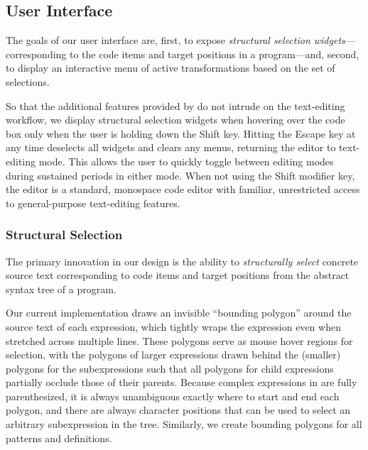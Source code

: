 \subsection{User Interface}
\label{sec:user-interface}

The goals of our user interface are, first, to expose \emph{structural
\maybecode{} selection widgets}---corresponding to the code items and target
positions in a \little{} program---and, second, to display an interactive menu
of active transformations based on the set of selections.

So that the additional features provided by \deuce{} do not intrude on
the text-editing workflow, we display structural selection widgets when hovering
over the code box only when the user is holding down the Shift key.
Hitting the Escape key at any time deselects all widgets
and clears any menus, returning the editor to text-editing mode.
This allows the user to quickly toggle between editing modes during
sustained periods in either mode.
When not using the Shift modifier key, the editor is a standard,
monospace code editor with familiar, unrestricted access to
general-purpose text-editing features.


\subsubsection{Structural \maybeCode{} Selection}

The primary innovation in our design is the ability to \emph{structurally
select} concrete source text corresponding to code items and target positions
from the abstract syntax tree of a program.


Our
current %
implementation draws an invisible ``bounding polygon'' around the
source text of each expression, which tightly wraps the expression
even when stretched across multiple lines. These polygons serve as mouse
hover regions for selection, with the polygons of larger
expressions drawn behind the (smaller) polygons for the
subexpressions such that all polygons for child expressions partially
occlude those of their parents. Because complex expressions in
\little{} are fully parenthesized, it is always unambiguous
exactly where to start and end each polygon, and there are always
character positions that can be used to select an arbitrary
subexpression in the tree. Similarly, we create bounding polygons for
all patterns and definitions.

